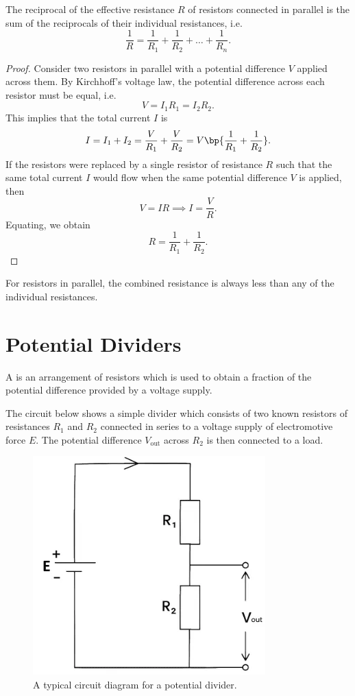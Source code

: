 \begin{proposition}
    The reciprocal of the effective resistance $R$ of resistors connected in parallel is the sum of the reciprocals of their individual resistances, i.e. \[\frac1{R} = \frac1{R_1} + \frac1{R_2} + \dots + \frac1{R_n}.\]
\end{proposition}
\begin{proof}
    Consider two resistors in parallel with a potential difference $V$ applied across them. By Kirchhoff's voltage law, the potential difference across each resistor must be equal, i.e. \[V = I_1 R_1 = I_2 R_2.\] This implies that the total current $I$ is \[I = I_1 + I_2 = \frac{V}{R_1} + \frac{V}{R_2} = V\bp{\frac1{R_1} + \frac1{R_2}}.\] If the resistors were replaced by a single resistor of resistance $R$ such that the same total current $I$ would flow when the same potential difference $V$ is applied, then \[V = IR \implies I = \frac{V}{R}.\] Equating, we obtain \[R = \frac1{R_1} + \frac1{R_2}.\]
\end{proof}

\begin{corollary}
    For resistors in parallel, the combined resistance is always less than any of the individual resistances.
\end{corollary}

\section{Potential Dividers}

\begin{definition}
    A  is an arrangement of resistors which is used to obtain a fraction of the potential difference provided by a voltage supply.
\end{definition}

The circuit below shows a simple divider which consists of two known resistors of resistances $R_1$ and $R_2$ connected in series to a voltage supply of electromotive force $E$. The potential difference $V_{\text{out}}$ across $R_2$ is then connected to a load.

\begin{figure}[H]
    \centering
    \includegraphics[scale=0.6]{media/Potential Divider.png}
    \caption{A typical circuit diagram for a potential divider.\protect\footnotemark}
\end{figure}

